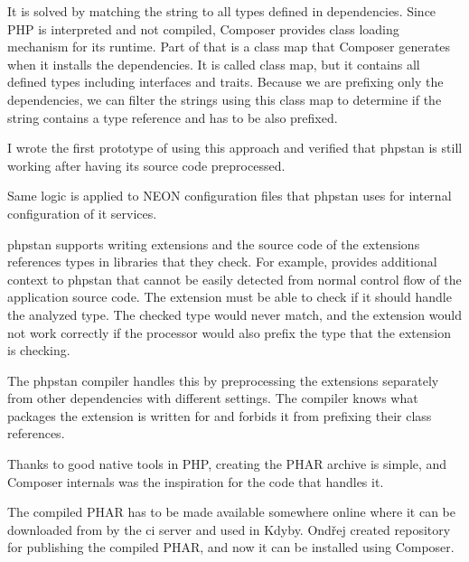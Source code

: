 It is solved by matching the string to all types defined in dependencies. Since PHP is interpreted and not compiled, Composer provides class loading mechanism for its runtime. Part of that is a class map that Composer generates when it installs the dependencies. It is called class map, but it contains all defined types including interfaces and traits. Because we are prefixing only the dependencies, we can filter the strings using this class map to determine if the string contains a type reference and has to be also prefixed.

I wrote the first prototype of  using this approach and verified that \gls{phpstan} is still working after having its source code preprocessed.

Same logic is applied to NEON configuration files that \gls{phpstan} uses for internal configuration of it services.

 \label{sec:refactoring:phpstan-extensions}

\gls{phpstan} supports writing extensions and the source code of the extensions references types in libraries that they check. For example,  provides additional context to \gls{phpstan} that cannot be easily detected from normal control flow of the application source code. The extension must be able to check if it should handle the analyzed type. The checked type would never match, and the extension would not work correctly if the processor would also prefix the type that the extension is checking.

The \gls{phpstan} compiler handles this by preprocessing the extensions separately from other dependencies with different settings. The compiler knows what packages the extension is written for and forbids it from prefixing their class references.

 \label{sec:refactoring:phpstan-phar}

Thanks to good native tools in PHP, creating the PHAR archive is simple, and Composer internals was the inspiration for the code that handles it.

 \label{sec:refactoring:phpstan-shim}

The compiled PHAR has to be made available somewhere online where it can be downloaded from by the \gls{ci} server and used in Kdyby. Ondřej created  repository for publishing the compiled PHAR, and now it can be installed using Composer.

